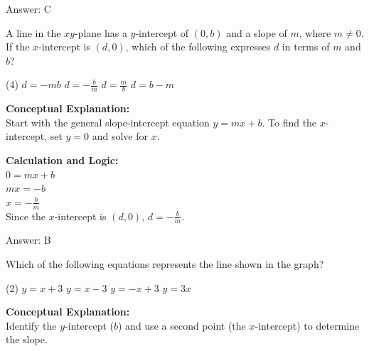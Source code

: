 \documentclass[11pt,paper=a4,answers]{exam}
\begin{document}
\begin{questions}
\begin{solution}
\vspace{15pt}
Answer: \colorbox{yellow!100}{C}
\end{solution}

\vspace{20pt}

\question
A line in the $xy$-plane has a $y$-intercept of $(0, b)$ and a slope of $m$, where $m \neq 0$. If the $x$-intercept is $(d, 0)$, which of the following expresses $d$ in terms of $m$ and $b$?
\begin{tasks}(4)
    \task $d = -mb$
    \task $d = -\frac{b}{m}$
    \task $d = \frac{m}{b}$
    \task $d = b - m$
\end{tasks}

\begin{solution}
\textbf{Conceptual Explanation:} \\
Start with the general slope-intercept equation $y = mx + b$. To find the $x$-intercept, set $y = 0$ and solve for $x$.

\vspace{10pt}
\textbf{Calculation and Logic:} \\
$0 = mx + b$ \\
$mx = -b$ \\
$x = -\frac{b}{m}$ \\
Since the $x$-intercept is $(d, 0)$, $d = -\frac{b}{m}$.

\vspace{15pt}
Answer: \colorbox{yellow!100}{B}
\end{solution}

\vspace{20pt}

\question

Which of the following equations represents the line shown in the graph?
\begin{tasks}(2)
    \task $y = x + 3$
    \task $y = x - 3$
    \task $y = -x + 3$
    \task $y = 3x$
\end{tasks}
\begin{center}
\end{center}
\begin{solution}
\textbf{Conceptual Explanation:} \\
Identify the $y$-intercept ($b$) and use a second point (the $x$-intercept) to determine the slope.


\end{solution}
\end{questions}
\end{document}
